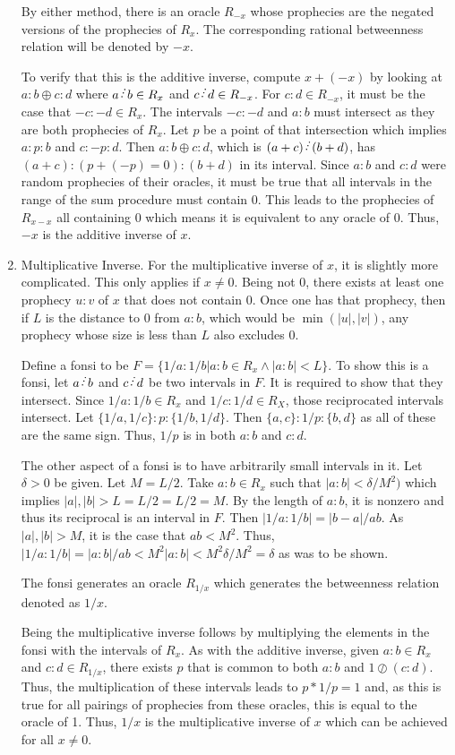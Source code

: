 \documentclass[12pt]{article}
\begin{document}
\begin{enumerate}
    By either method, there is an oracle $R_{-x}$ whose prophecies are the negated versions of the prophecies of $R_x$. The corresponding rational betweenness relation will be denoted by $-x$.
    
    To verify that this is the additive inverse, compute $x + (-x)$ by looking at $a:b \oplus c:d$ where $a \lte b \in R_x$ and $c \lte d \in R_{-x}$. For $c:d \in R_{-x}$, it must be the case that $-c:-d \in R_x$. The intervals $-c : -d$ and $a:b$ must intersect as they are both prophecies of $R_x$. Let $p$ be a point of that intersection which implies $a:p:b$ and $c:-p:d$. Then $a:b \oplus c:d$, which is $(a+c) \lte (b+d)$, has $(a+c) : ( p + (-p) =0 ) : (b+d)$ in its interval. Since $a:b$ and $c:d$ were random prophecies of their oracles, it must be true that all intervals in the range of the sum procedure must contain 0. This leads to the prophecies of $R_{x-x}$ all containing 0 which means it is equivalent to any oracle of 0. Thus, $-x$ is the additive inverse of $x$. 
    
    \item Multiplicative Inverse. For the multiplicative inverse of $x$, it is slightly more complicated. This only applies if $x \neq 0$. Being not 0, there exists at least one prophecy $u:v$ of $x$ that does not contain 0. Once one has that prophecy, then if $L$ is the distance to 0 from $a:b$, which would be $\min(|u|, |v|)$, any prophecy whose size is less than $L$ also excludes 0. 
    
    Define a fonsi to be $F = \{1/a : 1/b | a:b \in R_x \wedge |a:b| < L \}$. To show this is a fonsi, let $a\lte b$ and $c \lte d$ be two intervals in $F$. It is required to show that they intersect. Since $1/a:1/b \in R_x$ and $1/c:1/d \in R_X$, those reciprocated intervals intersect. Let $\{1/a, 1/c\} : p : \{1/b, 1/d\}$. Then $\{a, c\} : 1/p : \{b, d\}$ as all of these are the same sign. Thus, $1/p$ is in both $a:b$ and $c:d$. 

    The other aspect of a fonsi is to have arbitrarily small intervals in it. Let $\delta > 0$ be given. Let $M = L/2$. Take $a:b \in R_x$ such that $|a:b| < \delta/M^2)$ which implies $|a|, |b| >  L=L/2 = L/2 = M$. By the length of $a:b$, it is nonzero and thus its reciprocal is an interval in $F$. Then $|1/a: 1/b| = |b-a|/ab$. As $|a|, |b| > M$, it is the case that $ab < M^2$. Thus, $|1/a:1/b| = |a:b|/ab < M^2|a:b| < M^2 \delta/M^2 = \delta$ as was to be shown. 
    
    The fonsi generates an oracle $R_{1/x}$ which generates the betweenness relation denoted as $1/x$. 

    Being the multiplicative inverse follows by multiplying the elements in the fonsi with the intervals of $R_x$. As with the additive inverse, given $a:b \in R_x$ and $c:d \in R_{1/x}$, there exists $p$ that is common to both $a:b$ and $1 \oslash (c:d)$. Thus, the multiplication of these intervals leads to $p *1/p = 1$ and, as this is true for all pairings of prophecies from these oracles, this is equal to the oracle of 1. Thus, $1/x$ is the multiplicative inverse of $x$ which can be achieved for all $x \neq 0$. 

\end{enumerate}
\end{document}
